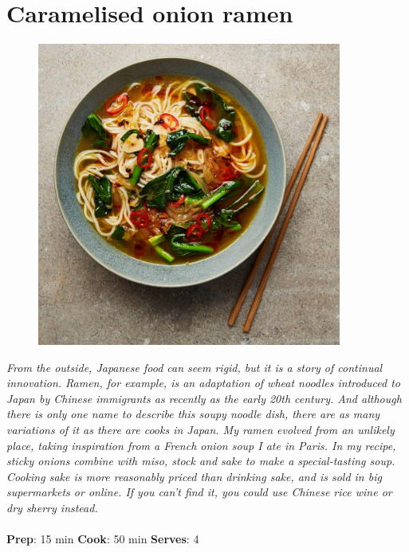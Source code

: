 \documentclass{book}
\begin{document}
\section{Caramelised onion ramen}
\begin{figure}
\centering\includegraphics[width=10cm,height=10cm,keepaspectratio]{Recipe_Pictures/Caramelised_onion_ramen.png}
\end{figure}
\emph{From the outside, Japanese food can seem rigid, but it is a story of continual innovation. Ramen, for example, is an adaptation of wheat noodles introduced to Japan by Chinese immigrants as recently as the early 20th century. And although there is only one name to describe this soupy noodle dish, there are as many variations of it as there are cooks in Japan. My ramen evolved from an unlikely place, taking inspiration from a French onion soup I ate in Paris. In my recipe, sticky onions combine with miso, stock and sake to make a special-tasting soup.\\ 
Cooking sake is more reasonably priced than drinking sake, and is sold in big supermarkets or online. If you can’t find it, you could use Chinese rice wine or dry sherry instead.}\\\\ 
\textbf{Prep}: 15 min
\textbf{Cook}: 50 min
\textbf{Serves}: 4
\end{document}
